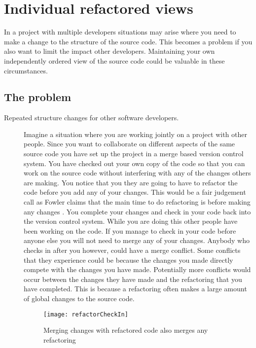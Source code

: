 
\chapter{Individual refactored views}

In a project with multiple developers situations may arise where you need to make a change to the structure of the source code. This becomes a problem if you also want to limit the impact other developers.  Maintaining your own independently ordered view of the source code could be valuable in these circumstances. 

\section{The problem}
\begin{description}
  \item [Repeated structure changes for other software developers.]   
    Imagine a situation where you are working jointly on a project with other people. Since you want to collaborate on different aspects of the same source code you have set up the project in a merge based version control system.  You have checked out your own copy of the code so that you can work on the source code without interfering with any of the changes others are making. You notice that you they are going to have to refactor the code before you add any of your changes.  This would be a fair judgement call as Fowler claims that the main time to do refactoring is before making any changes \cite{Fowler1999}. You complete your changes and check in your code back into the version control system.  While you are doing this other people have been working on the code.  If you manage to check in your code before anyone else you will not need to merge any of your changes.  Anybody who checks in after you however, could have a merge conflict.  Some conflicts that they experience could be because the changes you made directly compete with the changes you have made. Potentially more conflicts would occur between the changes they have made and the refactoring that you have completed. This is because a refactoring often makes a large amount of global changes to the source code.



    \begin{figure}
    \begin{center}
    \texttt{[image: refactorCheckIn]}
    \end{center}
    \caption{Merging changes with refactored code also merges any refactoring}
    \end{figure}


\end{description}
